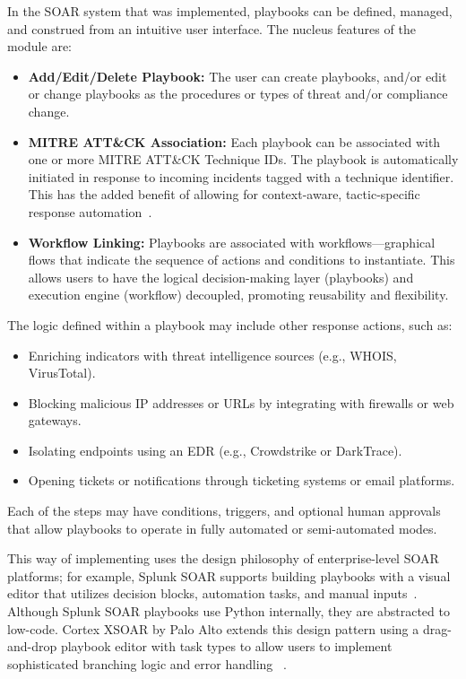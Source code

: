 In the SOAR system that was implemented, playbooks can be defined, managed, and construed from an intuitive user interface. The nucleus features of the module are:

\begin{itemize}[noitemsep,topsep=0pt]
    \item \textbf{Add/Edit/Delete Playbook:} The user can create playbooks, and/or edit or change playbooks as the procedures or types of threat and/or compliance change.
    
    \item \textbf{MITRE ATT\&CK Association:} Each playbook can be associated with one or more MITRE ATT\&CK Technique IDs. The playbook is automatically initiated in response to incoming incidents tagged with a technique identifier. This has the added benefit of allowing for context-aware, tactic-specific response automation~\cite{mitre}.
    
    \item \textbf{Workflow Linking:} Playbooks are associated with workflows—graphical flows that indicate the sequence of actions and conditions to instantiate. This allows users to have the logical decision-making layer (playbooks) and execution engine (workflow) decoupled, promoting reusability and flexibility.
\end{itemize}

The logic defined within a playbook may include other response actions, such as:
\begin{itemize}[noitemsep,topsep=0pt]
    \item Enriching indicators with threat intelligence sources (e.g., WHOIS, VirusTotal).
    \item Blocking malicious IP addresses or URLs by integrating with firewalls or web gateways.
    \item Isolating endpoints using an EDR (e.g., Crowdstrike or DarkTrace).
    \item Opening tickets or notifications through ticketing systems or email platforms.
\end{itemize}

Each of the steps may have conditions, triggers, and optional human approvals that allow playbooks to operate in fully automated or semi-automated modes.

This way of implementing uses the design philosophy of enterprise-level SOAR platforms; for example, Splunk SOAR supports building playbooks with a visual editor that utilizes decision blocks, automation tasks, and manual inputs~\cite{splunk}. Although Splunk SOAR playbooks use Python internally, they are abstracted to low-code. Cortex XSOAR by Palo Alto extends this design pattern using a drag-and-drop playbook editor with task types to allow users to implement sophisticated branching logic and error handling ~\cite{paloalto}.

